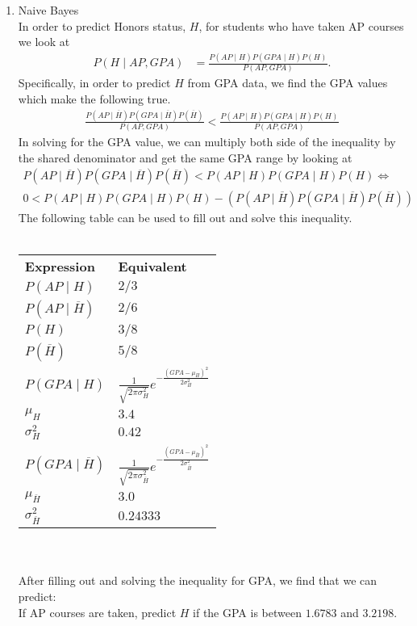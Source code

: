 \documentclass[12pt]{article}
\begin{document}
\begin{enumerate}
  	\item Naive Bayes \\
  		In order to predict Honors status, $H$, for students who have taken AP courses we look at 
  		\begin{align*}
  			P(H \mid AP, GPA) &= \frac{P(AP \mid H) P(GPA \mid H) P(H)}{P(AP,GPA)}.
  		\end{align*}
  		Specifically, in order to predict $H$ from GPA data, we find the GPA values which make the following true.
  		\begin{align*}
  		\frac{P(AP \mid \overline{H}) P(GPA \mid \overline{H}) P(\overline{H})}{P(AP,GPA)} < \frac{P(AP \mid H) P(GPA \mid H) P(H)}{P(AP,GPA)}
  		\end{align*} 
  		In solving for the GPA value, we can multiply both side of the inequality by the shared denominator and get the same GPA range by looking at 
  		\begin{align*}
  		P(AP \mid \overline{H}) P(GPA \mid \overline{H}) P(\overline{H}) < P(AP \mid H) P(GPA \mid H) P(H) \Longleftrightarrow \\
  		0 < P(AP \mid H) P(GPA \mid H) P(H) - \left( P(AP \mid \overline{H}) P(GPA \mid \overline{H}) P(\overline{H}) \right) 
  		\end{align*}
  		The following table can be used to fill out and solve this inequality.\\ \\
  		\begin{tabular}{l l}
  			\textbf{Expression} & \textbf{Equivalent} \\
  			$P(AP \mid H)$ & $2/3$ \\
  			$P(AP \mid \overline{H})$ & $2/6$ \\
  			$P(H)$ & $3/8$ \\
  			$P(\overline{H})$ & $5/8$ \\
  			$P(GPA \mid H)$ & $\frac{1}{\sqrt{2\pi\sigma_{H}^2}} e^{- \frac{(GPA - \mu_{H})^2}{2\sigma_{H}^2}} $ \\  	
  			$\mu_{H}$ & $3.4$ \\		
  			$\sigma_{H}^2$ & $0.42$ \\
  			$P(GPA \mid \overline{H})$ & $\frac{1}{\sqrt{2\pi\sigma_{\overline{H}}^2}} e^{- \frac{(GPA - \mu_{\overline{H}})^2}{2\sigma_{\overline{H}}^2}} $ \\
  			$\mu_{\overline{H}}$ & $3.0$ \\
  			$\sigma_{\overline{H}}^2$ & $0.24333$ \\
  		\end{tabular} \\ \\
  		After filling out and solving the inequality for GPA, we find that we can predict: \\
  		If AP courses are taken, predict $H$ if the GPA is between $1.6783$ and $3.2198$. \\ 
  		

\end{enumerate}
\end{document}
